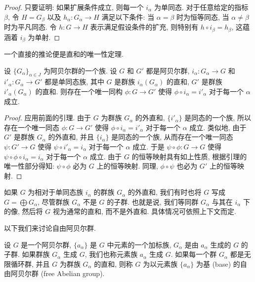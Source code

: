 \begin{proof}
只要证明: 如果扩展条件成立, 则每一个 $i_{\alpha}$ 为单同态. 对于任意给定的指标 $\beta$, 令 $H=G_{\beta}$ 以及 $h_{\alpha}\colon G_{\alpha}\to H$ 满足以下条件: 当 $\alpha=\beta$ 时为恒等同态, 当 $\alpha\neq\beta$ 时为平凡同态. 令 $h\colon G\to H$ 表示满足假设条件的扩充, 则特别有 $h\circ i_{\beta}=h_{\beta}$, 这蕴涵着 $i_{\beta}$ 为单射.
\end{proof}

一个直接的推论便是直和的唯一性定理.

\begin{theorem}\label{ch11:thm-direct-sum-uniqueness}
设 $\{G_{\alpha}\}_{\alpha\in J}$ 为阿贝尔群的一个族. 设 $G$ 和 $G'$ 都是阿贝尔群, $i_{\alpha}\colon G_{\alpha}\to G$ 和 $i'_{\alpha}\colon G_{\alpha}\to G'$ 都是单同态族, 其中 $G$ 是群族 $i_{\alpha}(G_{\alpha})$ 的直和, $G'$ 是群族 $i'_{\alpha}(G_{\alpha})$ 的直和. 则存在一个唯一同构 $\phi\colon G\to G'$ 使得 $\phi\circ i_{\alpha}=i'_{\alpha}$ 对于每一个 $\alpha$ 成立.
\end{theorem}

\begin{proof}
应用前面的引理. 由于 $G$ 为群族 $G_{\alpha}$ 的外直和, $\{i'_{\alpha}\}$ 是同态的一个族, 所以存在一个唯一同态 $\phi\colon G\to G'$ 使得 $\phi\circ i_{\alpha}=i'_{\alpha}$ 对于每一个 $\alpha$ 成立. 类似地, 由于 $G'$ 是群族 $G_{\alpha}$ 的外直和, 并且 $\{i_{\alpha}\}$ 是同态的一个族, 从而存在一个唯一同态 $\psi\colon G'\to G$ 使得 $\psi\circ i'_{\alpha}=i_{\alpha}$ 对于每一个 $\alpha$ 成立. 于是 $\psi\circ\phi\colon G\to G$ 使得 $\psi\circ\phi\circ i_{\alpha}=i_{\alpha}$ 对于每一个 $\alpha$ 成立. 由于 $G$ 的恒等映射具有如上性质, 根据引理的唯一性部分得知: $\psi\circ\phi$ 必为 $G$ 上的恒等映射. 同理, $\phi\circ\psi$ 也必为 $G'$ 上的恒等映射.
\end{proof}

如果 $G$ 为相对于单同态族 $i_{\alpha}$ 的群族 $G_{\alpha}$ 的外直和, 我们有时也将 $G$ 写成 $G=\bigoplus G_{\alpha}$, 尽管群族 $G_{\alpha}$ 不是 $G$ 的子群. 也就是说, 我们等同群 $G_{\alpha}$ 与其在 $i_{\alpha}$ 下的像, 然后将 $G$ 视为通常的直和, 而不是外直和. 具体情况可依照上下文而定.

以下我们来讨论自由阿贝尔群.

\begin{definition}\label{ch11:def-free-abelian}
设 $G$ 是一个阿贝尔群, $\{a_{\alpha}\}$ 是 $G$ 中元素的一个加标族, $G_{\alpha}$ 是由 $a_{\alpha}$ 生成的 $G$ 的子群. 如果群族 $G_{\alpha}$ 生成 $G$, 我们也称元素族 $a_{\alpha}$ 生成 $G$. 如果每一个群 $G_{\alpha}$ 都是无限循环群, 并且 $G$ 为群族 $G_{\alpha}$ 的直和, 则称 $G$ 为以元素族 $\{a_{\alpha}\}$ 为基 (base) 的自由阿贝尔群 (free Abelian group).
\end{definition}

